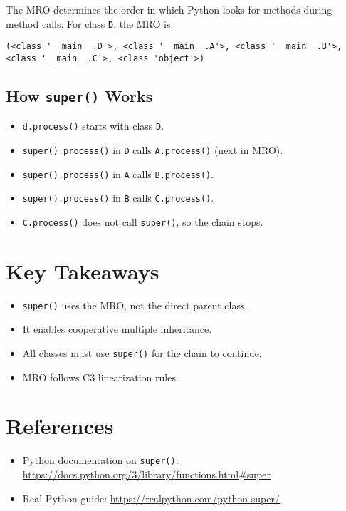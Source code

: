 \documentclass{article}
\begin{document}
The MRO determines the order in which Python looks for methods during method calls. For class \texttt{D}, the MRO is:

\begin{verbatim}
(<class '__main__.D'>, <class '__main__.A'>, <class '__main__.B'>, <class '__main__.C'>, <class 'object'>)
\end{verbatim}

\subsection*{How \texttt{super()} Works}

\begin{itemize}
    \item \texttt{d.process()} starts with class \texttt{D}.
    \item \texttt{super().process()} in \texttt{D} calls \texttt{A.process()} (next in MRO).
    \item \texttt{super().process()} in \texttt{A} calls \texttt{B.process()}.
    \item \texttt{super().process()} in \texttt{B} calls \texttt{C.process()}.
    \item \texttt{C.process()} does not call \texttt{super()}, so the chain stops.
\end{itemize}

\section*{Key Takeaways}
\begin{itemize}
    \item \texttt{super()} uses the MRO, not the direct parent class.
    \item It enables cooperative multiple inheritance.
    \item All classes must use \texttt{super()} for the chain to continue.
    \item MRO follows C3 linearization rules.
\end{itemize}

\section*{References}
\begin{itemize}
    \item Python documentation on \texttt{super()}: \url{https://docs.python.org/3/library/functions.html#super}
    \item Real Python guide: \url{https://realpython.com/python-super/}
\end{itemize}
\end{document}
